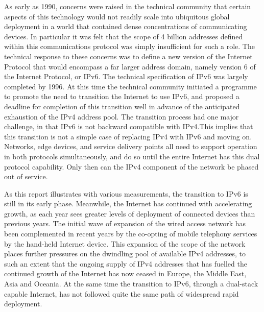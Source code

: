 \documentclass[11pt]{report}
\begin{document}
As early as 1990, concerns were raised in the technical community that
certain aspects of this technology would not readily scale into ubiquitous global deployment in a world that
contained dense concentrations of communicating devices. In particular it was felt that the scope of
4 billion addresses defined within this communications protocol was simply insufficient for such a role.
The technical response to these concerns was to define a new version of the Internet Protocol that would
encompass a far larger address domain, namely version 6 of the Internet Protocol, or IPv6. The technical
specification of IPv6 was largely completed by 1996. At this time the technical community initiated a
programme to promote the need to transition the Internet to use IPv6, and proposed a deadline for
completion of this transition well in advance of the anticipated exhaustion of the IPv4 address pool. The
transition process had one major challenge, in that IPv6 is not backward compatible with IPv4.This
implies that this transition is not a simple case of replacing IPv4 with IPv6 and moving on. Networks, edge
devices, and service delivery points all need to support operation in both protocols simultaneously, and do
so until the entire Internet has this dual protocol capability. Only then can the IPv4 component of the
network be phased out of service.

As this report illustrates with various measurements, the transition to IPv6 is still in its early
phase. Meanwhile, the Internet has continued with accelerating growth, as each year sees greater levels of
deployment of connected devices than previous years. The initial wave of expansion of the wired access
network has been complemented in recent years by the co-opting of mobile telephony services by the
hand-held Internet device. This expansion of the scope of the network places further pressures on the
dwindling pool of available IPv4 addresses, to such an extent that the ongoing supply of IPv4 addresses
that has fuelled the continued growth of the Internet has now ceased in Europe, the Middle East, Asia and
Oceania. At the same time the transition to IPv6, through a dual-stack capable Internet, has not followed
quite the same path of widespread rapid deployment.
\end{document}
